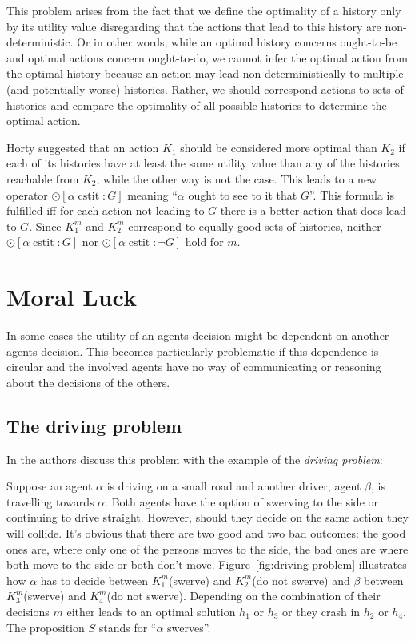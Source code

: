 \documentclass{article}
\newcommand{\cstit}{\operatorname{cstit}}
\begin{document}
This problem arises from the fact that we define the optimality of a history only by its utility value disregarding that the actions that lead to this history are non-deterministic. Or in other words, while an optimal history concerns ought-to-be and optimal actions concern ought-to-do, we cannot infer the optimal action from the optimal history because an action may lead non-deterministically to multiple (and potentially worse) histories. Rather, we should correspond actions to sets of histories and compare the optimality of all possible histories to determine the optimal action.

Horty suggested that an action $K_1$ should be considered more optimal than $K_2$ if each of its histories have at least the same utility value than any of the histories reachable from $K_2$, while the other way is not the case. This leads to a new operator $\odot [\alpha \cstit \colon G]$ meaning \enquote{$\alpha$ ought to see to it that $G$}. This formula is fulfilled iff for each action not leading to $G$ there is a better action that does lead to $G$. Since $K_1^m$ and $K_2^m$ correspond to equally good sets of histories, neither $\odot [\alpha \cstit \colon G]$ nor $\odot [\alpha \cstit \colon \neg G]$ hold for $m$.


\section{Moral Luck}
In some cases the utility of an agents decision might be dependent on another agents decision. This becomes particularly problematic if this dependence is circular and the involved agents have no way of communicating or reasoning about the decisions of the others.

\subsection{The driving problem}
In \cite{mdl} the authors discuss this problem with the example of the \emph{driving problem}:

Suppose an agent $\alpha$ is driving on a small road and another driver, agent $\beta$, is travelling towards $\alpha$. Both agents have the option of swerving to the side or continuing to drive straight. However, should they decide on the same action they will collide. It's obvious that there are two good and two bad outcomes: the good ones are, where only one of the persons moves to the side, the bad ones are where both move to the side or both don't move. 
Figure~\ref{fig:driving-problem} illustrates how $\alpha$ has to decide between $K_1^m$(swerve) and $K_2^m$(do not swerve) and $\beta$ between $K_3^m$(swerve) and $K_4^m$(do not swerve). Depending on the combination of their decisions $m$ either leads to an optimal solution $h_1$ or $h_3$ or they crash in $h_2$ or $h_4$. The proposition $S$ stands for \enquote{$\alpha$ swerves}.
\end{document}
